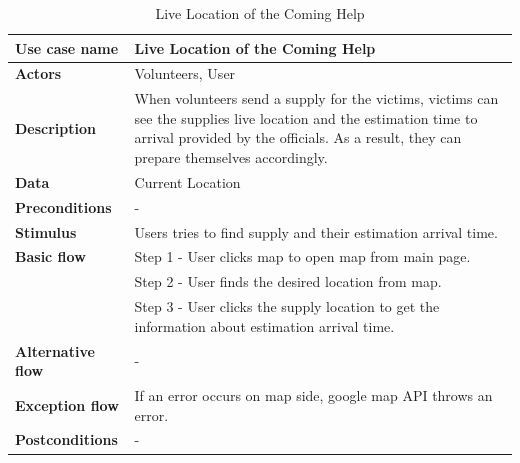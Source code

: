 \begin{center}
    \begin{table}[H]
        \begin{tabular}{| m{3cm}| m{10cm} |}
            \hline
            \textbf{Use case name} & Live Location of the Coming Help\\
            \hline
            \textbf{Actors} & Volunteers, User\\
            \hline
            \textbf{Description} & When volunteers send a supply for the victims, victims can see the supplies live location and the estimation time to arrival provided by the officials. As a result, they can prepare themselves accordingly.\\
            \hline
            \textbf{Data} & Current Location\\
            \hline
            \textbf{Preconditions} & - \\
            \hline
            \textbf{Stimulus} & Users tries to find supply and their estimation arrival time.\\
            \hline
            \textbf{Basic flow} & Step 1 - User clicks map to open map from main page.\\
                                & Step 2 - User finds the desired location from map. \\
                                & Step 3 - User clicks the supply location to get the information about estimation arrival time. \\
            \hline
            \textbf{Alternative flow} & - \\
            \hline
            \textbf{Exception flow} & If an error occurs on map side, google map API throws an error.\\
            \hline
            \textbf{Postconditions} & - \\
            \hline
        \end{tabular}
        \caption[Live Location of the Coming Help]{Live Location of the Coming Help}
    \end{table}
\end{center}

